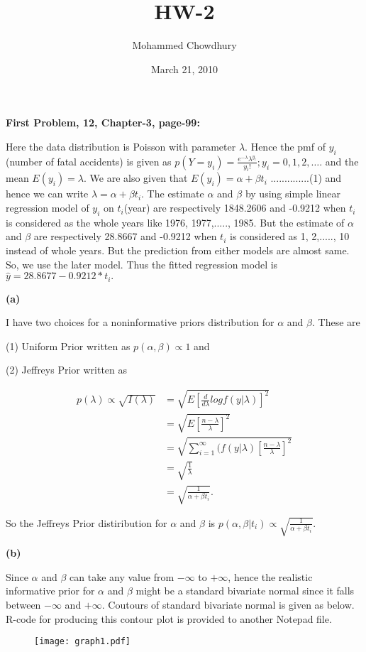 \documentclass[12pt]{article}
\title{HW-2}
\author{Mohammed Chowdhury}
\date{March 21, 2010}
\begin{document}
\maketitle
\begin{center}
\textbf{First Problem, 12, Chapter-3, page-99:}
\end{center}
Here the data distribution is Poisson with parameter $\lambda.$ Hence the pmf of $y_{i}$(number of fatal accidents) is given as $p(Y=y_{i})=\frac{e^{-\lambda}{\lambda^{y_{i}}}}{y_{i}!}; y_{i}=0,1,2, \dots.$ and the mean $E(y_{i})=\lambda$. We are also given that $E(y_{i})=\alpha+\beta t_{i}$ ..............(1) and hence we can write $\lambda=\alpha+\beta t_{i}.$ The estimate $\alpha$ and $\beta$ by using simple linear regression model of $y_{i}$ on $t_{i}$(year) are respectively  1848.2606 and -0.9212 when $t_{i}$ is considered as the whole years like 1976, 1977,....., 1985. But the estimate of $\alpha$ and $\beta$ are respectively 28.8667 and -0.9212 when $t_{i}$ is considered as 1, 2,....., 10 instead of whole years. But the prediction from either models are almost same. So, we use the later model. Thus the fitted regression model is $\hat{y}=28.8677-0.9212*t_{i}.$

\textbf{(a)}

I have two choices for a noninformative priors distribution for $\alpha$ and $\beta$. These are 

(1) Uniform Prior written as $p(\alpha, \beta)\propto 1$ and 

(2) Jeffreys Prior written as  

\begin{equation*}
\begin{split}
p(\lambda)\propto \sqrt{I(\lambda)}&=\sqrt{E[\frac{d}{d\lambda}logf(y|\lambda)]^2}\\
&=\sqrt{E[\frac{n-\lambda}{\lambda}]^2}\\
&=\sqrt{\sum_{i=1}^\infty(f(y|\lambda)[\frac{n-\lambda}{\lambda}]^2}\\
&=\sqrt{\frac{1}{\lambda}}\\
&=\sqrt{\frac{1}{\alpha+\beta t_{i}}}.
\end{split}
\end{equation*}

So the Jeffreys Prior distiribution for $\alpha$ and $\beta$ is $p(\alpha, \beta|t_{i})\propto\sqrt{\frac{1}{\alpha+\beta t_{i}}}.$

\textbf{(b)}

Since $\alpha$ and $\beta$ can take any value from $-\infty$ to $+\infty$, hence the realistic informative prior for $\alpha$ and $\beta$ might be a standard bivariate normal since it falls between $-\infty$ and $+\infty$. Coutours of standard bivariate normal is given as below. R-code for producing this contour plot is provided to another Notepad file. 
\newpage
\begin{figure}[h]
\centering
\texttt{[image: graph1.pdf]}
\end{figure}
\end{document}
